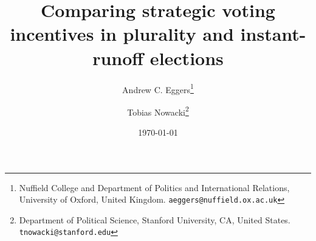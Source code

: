 \documentclass[12pt, letter]{article}
\begin{document}
\author{Andrew C. Eggers\thanks{Nuffield College and Department of Politics and International Relations, University of Oxford, United Kingdom. \texttt{aeggers@nuffield.ox.ac.uk}}
\and
Tobias Nowacki\thanks{Department of Political Science, Stanford University, CA, United States. \texttt{tnowacki@stanford.edu}}}
\date{\today}
\title{Comparing strategic voting incentives in plurality and instant-runoff elections}

\maketitle

\onehalfspacing %

\setcounter{section}{3}



\end{document}
